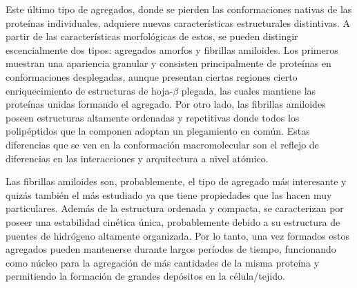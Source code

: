 Este último tipo de agregados, donde se pierden las conformaciones nativas de las proteínas individuales, adquiere nuevas características estructurales distintivas.
A partir de las características morfológicas de estos, se pueden distingir escencialmente dos tipos: agregados amorfos y fibrillas amiloides.
Los primeros muestran una apariencia granular y consisten principalmente de proteínas en conformaciones desplegadas, aunque presentan ciertas regiones cierto enriquecimiento de estructuras de hoja-$\beta$ plegada, las cuales
mantiene las proteínas unidas formando el agregado.
Por otro lado, las fibrillas amiloides poseen estructuras altamente ordenadas y repetitivas donde todos los polipéptidos que la componen adoptan un plegamiento en común.
Estas diferencias que se ven en la conformación macromolecular son el reflejo de diferencias en las interacciones y arquitectura a nivel atómico.





Las fibrillas amiloides son, probablemente, el tipo de agregado más interesante y quizás también el más estudiado ya que tiene propiedades que las hacen muy particulares.
Además de la estructura ordenada y compacta, se caracterizan por poseer una estabilidad cinética única, probablemente debido a su estructura de puentes de hidrógeno altamente organizada.
Por lo tanto, una vez formados estos agregados pueden mantenerse durante largos períodos de tiempo, funcionando como núcleo para la agregación de más cantidades de la misma proteína 
y permitiendo la formación de grandes depósitos en la célula/tejido.


